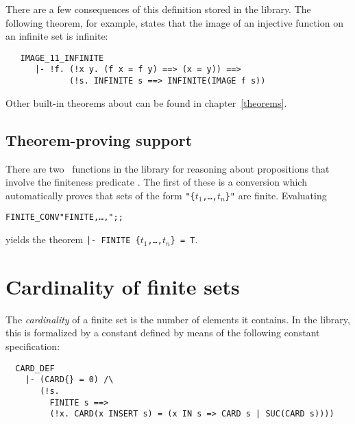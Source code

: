 \noindent There are a few consequences of this definition stored in the
 library.  The following theorem, for example, states that the image
of an injective function on an infinite set is infinite:

\begin{hol}
\begin{verbatim}
   IMAGE_11_INFINITE
      |- !f. (!x y. (f x = f y) ==> (x = y)) ==>
             (!s. INFINITE s ==> INFINITE(IMAGE f s))
\end{verbatim}\end{hol}

\noindent Other built-in theorems about  can be found in
chapter~\ref{theorems}.

\subsection{Theorem-proving support}

There are two \ML\ functions in the  library for reasoning about
propositions that involve the finiteness predicate .
The
first of these is a conversion
 which automatically proves that sets of the form
{\small\verb!"{!\tt$t_1$,\dots,$t_n$\verb!}"!} are finite.  Evaluating

\begin{hol}\begin{alltt}
   FINITE\_CONV "FINITE \lb{},\dots,\rb";;
\end{alltt}\end{hol}

\noindent yields the theorem
{\small\verb!|- FINITE {!\tt$t_1$,\dots,$t_n$\verb!} = T!}.%
%



\section{Cardinality of finite sets}

The {\it cardinality\/} of a finite set is the number of elements it contains.
In the  library, this is formalized by a constant  defined by
means of the following constant specification:

\begin{hol}
\begin{verbatim}
  CARD_DEF
    |- (CARD{} = 0) /\
       (!s.
         FINITE s ==>
         (!x. CARD(x INSERT s) = (x IN s => CARD s | SUC(CARD s))))
\end{verbatim}\end{hol}

